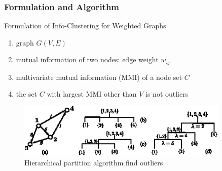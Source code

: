 \documentclass[notheorems]{beamer}
\begin{document}

\begin{frame}
\frametitle{Formulation and Algorithm}
Formulation of Info-Clustering for Weighted Graphs
\begin{enumerate}
\item graph $G(V, E)$
\item mutual information of two nodes: edge weight $w_{ij}$
\item multivariate mutual information (MMI) of a node set $C$
\item the set $C$ with largest MMI other than $V$ is not outliers
\end{enumerate}
\begin{figure}
	\includegraphics[width=0.9\textwidth]{alg_illustration.eps}
	\caption{Hierarchical partition algorithm find outliers}
\end{figure}
\end{frame}
\end{document}

